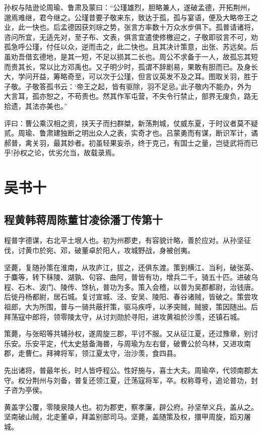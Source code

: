 \documentclass[12pt,UTF8]{ctexbook}
\begin{document}
孙权与陆逊论周瑜、鲁肃及蒙曰：“公瑾雄烈，胆略兼人，遂破孟德，开拓荆州，邈焉难继，君今继之。公瑾昔要子敬来东，致达于孤，孤与宴语，便及大略帝王之业，此一快也。后孟德因获刘琮之势，张言方率数十万众水步俱下。孤普请诸将，咨问所宜，无适先对，至子布、文表，俱言宜遣使修檄迎之，子敬即驳言不可，劝孤急呼公瑾，付任以众，逆而击之，此二快也。且其决计策意，出张、苏远矣。后虽劝吾借玄德地，是其一短，不足以损其二长也。周公不求备于一人，故孤忘其短而贵其长，常以比方邓禹也。又子明少时，孤谓不辞剧易，果敢有胆而已。及身长大，学问开益，筹略奇至，可以次于公瑾，但言议英发不及之耳。图取关羽，胜于子敬。子敬答孤书云：‘帝王之起，皆有驱除，羽不足忌。’此子敬内不能办，外为大言耳，孤亦恕之，不苟责也。然其作军屯营，不失令行禁止，部界无废负，路无拾遗，其法亦美也。”

评曰：曹公乘汉相之资，挟天子而扫群桀，新荡荆城，仗威东夏，于时议者莫不疑贰。周瑜、鲁肃建独断之明出众人之表，实奇才也。吕蒙勇而有谋，断识军计，谲郝普，禽关羽，最其妙者。初虽轻果妄杀，终于克己，有国士之量，岂徒武将而已乎!孙权之论，优劣允当，故载录焉。

\part{吴书十}
\chapter{程黄韩蒋周陈董甘凌徐潘丁传第十}

程普字德谋，右北平土垠人也。初为州郡吏，有容貌计略，善於应对。从孙坚征伐，讨黄巾於宛、邓，破董卓於阳人，攻城野战，身被创夷。

坚薨，复随孙策在淮南，从攻庐江，拔之，还俱东渡。策到横江、当利，破张英、于麋等，转下秣陵、湖孰、句容、曲阿，普皆有功，增兵二千，骑五十匹。进破乌程、石木、波门、陵传、馀杭，普功为多。策入会稽，以普为吴郡都尉，治钱唐。后徙丹杨都尉，居石城。复讨宣城、泾、安吴、陵阳、春谷诸贼，皆破之。策尝攻祖郎，大为所围，普与一骑共蔽扞策，驱马疾呼，以矛突贼，贼披，策因随出。后拜荡寇中郎将，领零陵太守，从讨刘勋於寻阳，进攻黄祖於沙羡，还镇石城。

策薨，与张昭等共辅孙权，遂周旋三郡，平讨不服。又从征江夏，还过豫章，别讨乐安。乐安平定，代太史慈备海昬，与周瑜为左右督，破曹公於乌林，又进攻南郡，走曹仁。拜裨将军，领江夏太守，治沙羡，食四县。

先出诸将，普最年长，时人皆呼程公。性好施与，喜士大夫。周瑜卒，代领南郡太守。权分荆州与刘备，普复还领江夏，迁荡寇将军，卒。权称尊号，追论普功，封子咨为亭侯。

黄盖字公覆，零陵泉陵人也。初为郡吏，察孝廉，辟公府。孙坚举义兵，盖从之。坚南破山贼，北走董卓，拜盖别部司马。坚薨，盖随策及权，擐甲周旋，蹈刃屠城。
\end{document}
